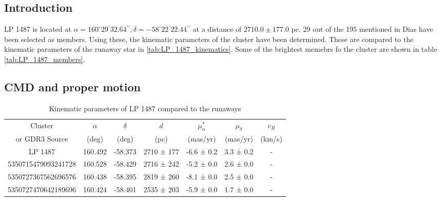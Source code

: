 \subsection{Introduction}
    LP 1487 is located at $\alpha = 160^\circ29{}^\prime32.64{}^{\prime\prime}, \delta = -58^\circ22{}^\prime22.44{}^{\prime\prime}$ at a distance of $2710.0\pm177.0$ pc.
    29 out of the 195 mentioned in Dias have been selected as members. Using these, the kinematic parameters of the cluster have been determined. These are compared to the kinematic parameters of the runaway star in \ref{tab:LP_1487_kinematics}. Some of the brightest memebrs fo the cluster are shown in table \ref{tab:LP_1487_members}.
    
    \subsection{CMD and proper motion}
    
    
    

\begin{table*}[h]
\caption{Kinematic parameters of LP 1487 compared to the runaways}
\begin{tabular}{ccccccc}
\hline
Cluster & $\alpha$ & $\delta$ & $d$ & $\mu_{\alpha}^*$ & $\mu_{\delta}$ & $v_R$ \\
or GDR3 Source & (deg) & (deg) & (pc) & (mas/yr) & (mas/yr) & (km/s) \\
\hline
LP 1487 & 160.492 & -58.373 & 2710 ± 177 & -6.6 ± 0.2 & 3.3 ± 0.2 & - \\
5350715479093241728 & 160.528 & -58.429 & 2716 ± 242 & -5.2 ± 0.0 & 2.6 ± 0.0 & - \\
5350727367562696576 & 160.438 & -58.395 & 2819 ± 260 & -8.1 ± 0.0 & 2.5 ± 0.0 & - \\
5350727470642189696 & 160.424 & -58.401 & 2535 ± 203 & -5.9 ± 0.0 & 1.7 ± 0.0 & - \\
\hline
\end{tabular}
\end{table*}


